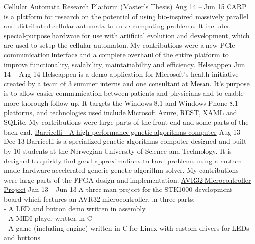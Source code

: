 \documentclass[print]{friggeri-cv}
\begin{document}
\begin{entrylist}
    \entryy
        {\href{https://github.com/lundal/carp}{Cellular Automata Research Platform (Master's Thesis)}}
        {Aug 14 – Jun 15}
        {CARP is a platform for research on the potential of using bio-inspired massively parallel and distributed cellular automata to solve computing problems.
         It includes special-purpose hardware for use with artificial evolution and development, which are used to setup the cellular automaton.
         My contributions were a new PCIe communication interface and a complete overhaul of the entire platform to improve functionality, scalability, maintainability and efficiency.}
    \entryspace
    \entryy
        {\href{http://fagblogg.mesan.no/sommerjobb-2014-del-2/}{Helseappen}}
        {Jun 14 – Aug 14}
        {Helseappen is a demo-application for Microsoft's health initiative created by a team of 3 summer interns and one consultant at Mesan.
         It's purpose is to allow easier communication between patients and physicians and to enable more thorough follow-up.
         It targets the Windows 8.1 and Windows Phone 8.1 platforms, and technologies used include Microsoft Azure, REST, XAML and SQLite.
         My contributions were large parts of the front-end and some parts of the back-end.}
    \entryspace
    \entryy
        {\href{http://lund.al/barricel.li/}{Barricelli - A high-performance genetic algorithms computer}}
        {Aug 13 – Dec 13}
        {Barricelli is a specialized genetic algorithms computer designed and built by 10 students at the Norwegian University of Science and Technology.
         It is designed to quickly find good approximations to hard problems using a custom-made hardware-accelerated generic genetic algorithm solver.
         My contributions were large parts of the FPGA design and implementation.}
    \entryspace
    \entryy
        {\href{https://github.com/lundal/avr32-project-2013}{AVR32 Microcontroller Project}}
        {Jan 13 – Jun 13}
        {A three-man project for the STK1000 development board which features an AVR32 microcontroller, in three parts:\\
        - A LED and button demo written in assembly\\
        - A MIDI player written in C\\
        - A game (including engine) written in C for Linux with custom drivers for LEDs and buttons}
\end{entrylist}
\end{document}
